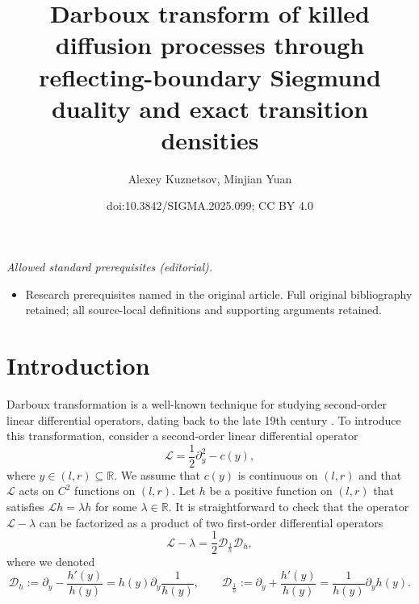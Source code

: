 \documentclass[10pt,a4paper]{amsart}
\title{Darboux transform of killed diffusion processes through reflecting-boundary Siegmund duality and exact transition densities}
\author{Alexey Kuznetsov, Minjian Yuan}
\date{doi:10.3842/SIGMA.2025.099; CC BY 4.0}
\numberwithin{equation}{section}
\theoremstyle{definition}
\def\L{{\mathcal L}}
\def\D{{\mathcal D}}
\def\r{{\mathbb R}}
\begin{document}
\maketitle
\noindent\textit{Allowed standard prerequisites (editorial).}\begin{itemize}
\item Research prerequisites named in the original article. Full original bibliography retained; all source-local definitions and supporting arguments retained.
\end{itemize}\medskip
\section{Introduction}\label{section_intro}

Darboux transformation is a well-known technique for studying second-order linear differential operators, dating back to the late 19th century \cite{Darboux_1882}.
To introduce this transformation, consider a second-order linear differential operator
 \begin{equation}\label{def_L}
 {\mathcal L}=\frac{1}{2} \partial_y^2 - c(y),
 \end{equation}
 where $y \in (l,r)\subseteq \r$. We assume that $c(y)$ is continuous on $(l,r)$ and that $\L$ acts on $C^2$ functions on $(l,r)$. Let $h$ be a positive function on $(l,r)$ that satisfies $\L h = \lambda h$ for some $\lambda \in \r$. It is straightforward to check that the operator $\L-\lambda$ can be factorized as a product of two first-order differential operators
 \begin{equation}\label{L_factorization}
 \L-\lambda =\frac{1}{2}\D_{\frac{1}{h}} \D_h,
 \end{equation}
 where we denoted
\[
{\mathcal D}_{h}:=\partial_y-\frac{h'(y)}{h(y)}=h(y) \partial_y \frac{1}{h(y)}, \qquad
{\mathcal D}_{\frac{1}{h}}:=\partial_y+\frac{h'(y)}{h(y)}=\frac{1}{h(y)} \partial_y h(y).
\]
\end{document}
